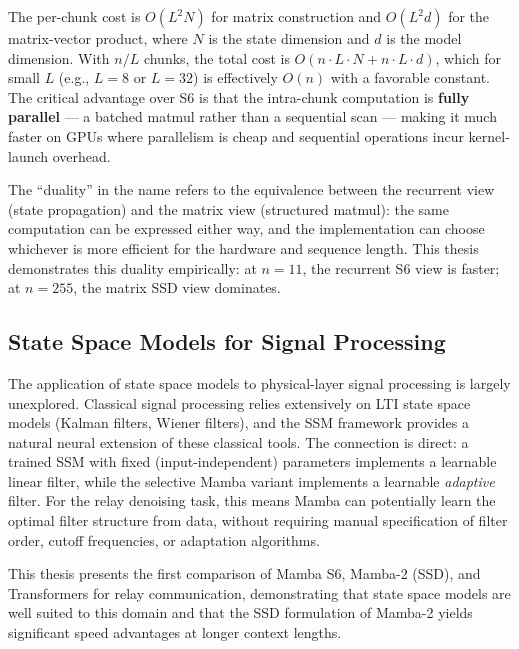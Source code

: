 The per-chunk cost is \(O(L^2 N)\) for matrix construction and \(O(L^2 d)\) for the matrix-vector product, where \(N\) is the state dimension and \(d\) is the model dimension. With \(n/L\) chunks, the total cost is \(O(n \cdot L \cdot N + n \cdot L \cdot d)\), which for small \(L\) (e.g., \(L = 8\) or \(L = 32\)) is effectively \(O(n)\) with a favorable constant. The critical advantage over S6 is that the intra-chunk computation is \textbf{fully parallel} --- a batched matmul rather than a sequential scan --- making it much faster on GPUs where parallelism is cheap and sequential operations incur kernel-launch overhead.

The ``duality'' in the name refers to the equivalence between the recurrent view (state propagation) and the matrix view (structured matmul): the same computation can be expressed either way, and the implementation can choose whichever is more efficient for the hardware and sequence length. This thesis demonstrates this duality empirically: at \(n = 11\), the recurrent S6 view is faster; at \(n = 255\), the matrix SSD view dominates.

\subsection{State Space Models for Signal Processing}\label{sec:state-space-models-for-signal-processing}

The application of state space models to physical-layer signal processing is largely unexplored. Classical signal processing relies extensively on LTI state space models (Kalman filters, Wiener filters), and the SSM framework provides a natural neural extension of these classical tools. The connection is direct: a trained SSM with fixed (input-independent) parameters implements a learnable linear filter, while the selective Mamba variant implements a learnable \emph{adaptive} filter. For the relay denoising task, this means Mamba can potentially learn the optimal filter structure from data, without requiring manual specification of filter order, cutoff frequencies, or adaptation algorithms.

This thesis presents the first comparison of Mamba S6, Mamba-2 (SSD), and Transformers for relay communication, demonstrating that state space models are well suited to this domain and that the SSD formulation of Mamba-2 yields significant speed advantages at longer context lengths.

